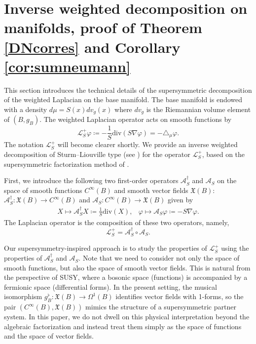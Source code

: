 \documentclass{amsart}
\theoremstyle{definition}
\theoremstyle{remark}
\numberwithin{equation}{section}
\newcommand{\diver}{{{\mathrm{div}}}}
\begin{document}
\section{Inverse weighted decomposition on manifolds, proof of Theorem \ref{DNcorres} and Corollary \ref{cor:sumneumann}} \label{sec:susy2}

This section introduces the technical details of the supersymmetric decomposition of the weighted Laplacian on the base manifold. The base manifold is endowed with a density $d\mu=S(x)dv_g(x)$ where $dv_g$ is the Riemannian volume element of $(B,g_B)$. The weighted Laplacian operator acts on smooth functions by 
\begin{equation}
 \mathscr{L}^+_S \varphi \coloneqq -\frac{1}{S} \diver \left( S \nabla \varphi \right)=-\triangle_\mu \varphi.
\end{equation}
The notation $\mathscr{L}_S^+$ will become clearer shortly. We provide an inverse weighted decomposition of Sturm--Liouville type (see \cite{LevitanSargsjan1991, Zettl2005}) for the operator $\mathscr{L}^+_S$, based on the supersymmetric factorization method of \cite{InfeldHull1951, CooperKhareSukhatme1995}. 

First, we introduce the following two first-order operators $\mathcal{A}^\dag_S$ and $\mathcal{A}_S$ on the space of smooth functions $C^\infty(B)$ and smooth vector fields $\mathfrak{X}(B)$: $\mathcal{A}^\dag_S\colon \mathfrak{X}(B) \to C^{\infty}(B)$ and $\mathcal{A}_S\colon C^{\infty}(B) \to \mathfrak{X}(B)$ given by
\begin{equation*}
\begin{array}{ll}
  X\mapsto \mathcal{A}^\dag_S X \coloneq \frac{1}{S}\diver(X),&\varphi\mapsto\mathcal{A}_S \varphi \coloneq -S\nabla\varphi.
\end{array} 
\end{equation*}
The Laplacian operator is the composition of these two operators, namely,
$$
\mathscr{L}_S^+=\mathcal{A}_S^\dag\circ \mathcal{A}_S.
$$

Our supersymmetry-inspired approach is to study the properties of $\mathscr{L}_S^+$ using the properties of $\mathcal{A}^\dag_S$ and $\mathcal{A}_S$. Note that we need to consider not only the space of smooth functions, but also the space of smooth vector fields. This is natural from the perspective of SUSY, where a bosonic space (functions) is accompanied by a fermionic space (differential forms). In the present setting, the musical isomorphism $g_B^\flat: \mathfrak{X}(B) \to \Omega^1(B)$ identifies vector fields with 1-forms, so the pair $(C^\infty(B), \mathfrak{X}(B))$ mimics the structure of a supersymmetric partner system. In this paper, we do not dwell on this physical interpretation beyond the algebraic factorization and instead treat them simply as the space of functions and the space of vector fields.
\end{document}
